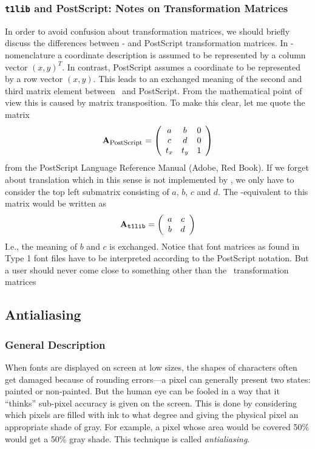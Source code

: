 \subsubsection{{\tt t1lib} and PostScript: Notes on Transformation Matrices}
In order to avoid confusion about transformation matrices, we should briefly
discuss the differences between \tonelib- and PostScript transformation
matrices. In \tonelib-nomenclature a coordinate description is assumed to be
represented by a column vector $(x,y)^T$. In contrast, PostScript assumes a
coordinate to be represented by a row vector $(x,y)$. This leads to an
exchanged meaning of the second and third matrix element between \tonelib\ and
PostScript. From the mathematical point of view this is caused by matrix
transposition. To make this clear, let me quote the matrix 
\begin{displaymath}
\mathbf{A}_{\mbox{\footnotesize PostScript}}=
\left( 
\begin{array}{ccc}
a & b & 0\\
c & d & 0\\
t_x & t_y & 1
\end{array}
\right)
\end{displaymath}
from the PostScript Language Reference Manual (Adobe, Red Book). If we forget
about translation which in this sense is not implemented by \tonelib, we only
have to consider the top left submatrix consisting of $a$, $b$, $c$ and $d$.
The \tonelib-equivalent to this matrix would be written as
\begin{displaymath}
\mathbf{A}_{\mbox{\tt\footnotesize t1lib}}=
\left( 
\begin{array}{cc}
a & c \\
b & d \\
\end{array}
\right)
\end{displaymath}
I.e., the meaning of $b$ and $c$ is exchanged. Notice that font matrices as
found in Type 1 font files have to be interpreted according to the PostScript
notation. But a user should never come close to something other than the
\tonelib\ transformation matrices

\subsection{Antialiasing}
\label{antialiasing}%
\subsubsection{General Description} 
When fonts are displayed on screen at low sizes, the shapes of characters often
get damaged because of rounding errors---a pixel can generally present two
states: painted or non-painted. But the human eye can be fooled in a
way that it 
``thinks'' sub-pixel accuracy is given on the screen. This is done by
considering which pixels are filled with ink to what degree and
giving the 
physical pixel an appropriate  shade of gray. For example, a pixel whose area
would be covered 50\% would get a 50\% gray shade. This technique is called
{\em antialiasing}.

